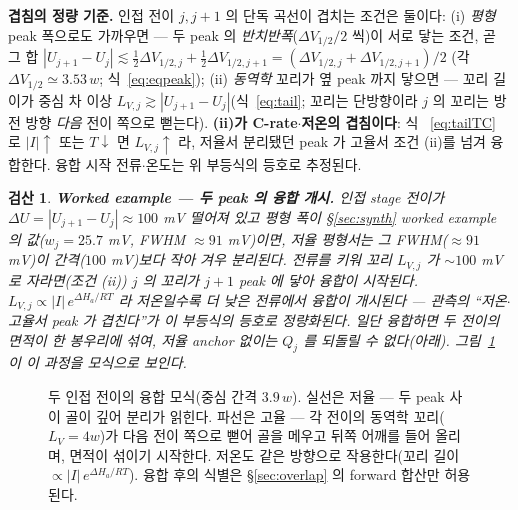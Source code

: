 \documentclass[11pt,a4paper]{article}
\newtheorem*{verifybox}{검산}
\newcommand{\dd}{\mathrm{d}}
\begin{document}
\textbf{겹침의 정량 기준.} 인접 전이 $j,j{+}1$ 의 단독 곡선이 겹치는 조건은 둘이다: (i) \emph{평형} peak
폭으로도 가까우면 — 두 peak 의 \emph{반치반폭}($\Delta V_{1/2}/2$ 씩)이 서로 닿는 조건, 곧 그 합
$|U_{j+1}-U_j|\lesssim\tfrac12\Delta V_{1/2,j}+\tfrac12\Delta V_{1/2,j+1}=(\Delta V_{1/2,j}+\Delta V_{1/2,j+1})/2$
(각 $\Delta V_{1/2}\simeq3.53\,w$; 식~\eqref{eq:eqpeak}); (ii) \emph{동역학} 꼬리가 옆 peak 까지 닿으면 — 꼬리 길이가 중심 차 이상
$L_{V,j}\gtrsim|U_{j+1}-U_j|$(식~\eqref{eq:tail}; 꼬리는 단방향이라 $j$ 의 꼬리는 방전 방향 \emph{다음} 전이 쪽으로
뻗는다). \textbf{(ii)가 C-rate$\cdot$저온의 겹침이다}: 식~
\eqref{eq:tailTC} 로 $|I|\uparrow$ 또는 $T\downarrow$ 면 $L_{V,j}\uparrow$ 라, 저율서 분리됐던 peak 가 고율서 조건
(ii)를 넘겨 융합한다. 융합 시작 전류$\cdot$온도는 위 부등식의 등호로 추정된다.
\begin{verifybox}
\textbf{Worked example — 두 peak 의 융합 개시.} 인접 stage 전이가 $\Delta U=|U_{j+1}-U_j|\approx100$ mV 떨어져
있고 평형 폭이 \S\ref{sec:synth} worked example 의 값($w_j=25.7$ mV, FWHM $\approx91$ mV)이면, 저율 평형서는 그
FWHM($\approx91$ mV)이 간격($100$ mV)보다
작아 \emph{겨우 분리}된다. 전류를 키워 꼬리 $L_{V,j}$ 가 $\sim100$ mV 로 자라면(조건 (ii)) $j$ 의 꼬리가 $j{+}1$
peak 에 닿아 \emph{융합이 시작}된다. $L_{V,j}\propto|I|\,e^{\Delta H_a/RT}$ 라 저온일수록 더 \emph{낮은} 전류에서
융합이 개시된다 — 관측의 ``저온$\cdot$고율서 peak 가 겹친다''가 이 부등식의 등호로 정량화된다. 일단 융합하면 두
전이의 면적이 한 봉우리에 섞여, 저율 anchor 없이는 $Q_j$ 를 되돌릴 수 없다(아래). 그림~\ref{fig:fusion} 이
이 과정을 모식으로 보인다.
\end{verifybox}
\begin{figure}[t]
\centering
{}
\caption{두 인접 전이의 융합 모식(중심 간격 $3.9\,w$). 실선은 저율 — 두 peak 사이 골이 깊어 분리가 읽힌다.
파선은 고율 — 각 전이의 동역학 꼬리($L_V=4w$)가 다음 전이 쪽으로 뻗어 골을 메우고 뒤쪽 어깨를 들어 올리며,
면적이 섞이기 시작한다. 저온도 같은 방향으로 작용한다(꼬리 길이 $\propto|I|\,e^{\Delta H_a/RT}$). 융합
후의 식별은 \S\ref{sec:overlap} 의 forward 합산만 허용된다.}
\label{fig:fusion}
\end{figure}
\end{document}
